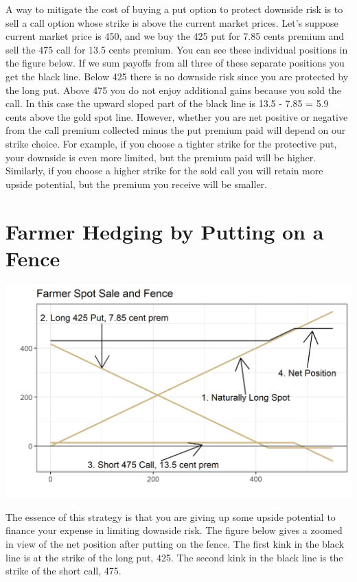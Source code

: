 \documentclass[
  letterpaper,
  DIV=11,
  numbers=noendperiod]{scrreprt}
\begin{document}
A way to mitigate the cost of buying a put option to protect downside
risk is to sell a call option whose strike is above the current market
prices. Let's suppose current market price is 450, and we buy the 425
put for 7.85 cents premium and sell the 475 call for 13.5 cents premium.
You can see these individual positions in the figure below. If we sum
payoffs from all three of these separate positions you get the black
line. Below 425 there is no downside risk since you are protected by the
long put. Above 475 you do not enjoy additional gains because you sold
the call. In this case the upward sloped part of the black line is 13.5
- 7.85 = 5.9 cents above the gold spot line. However, whether you are
net positive or negative from the call premium collected minus the put
premium paid will depend on our strike choice. For example, if you
choose a tighter strike for the protective put, your downside is even
more limited, but the premium paid will be higher. Similarly, if you
choose a higher strike for the sold call you will retain more upside
potential, but the premium you receive will be smaller.

\section{Farmer Hedging by Putting on a
Fence}\label{farmer-hedging-by-putting-on-a-fence}

\includegraphics{assets/Options4-spotfence.png}

The essence of this strategy is that you are giving up some upside
potential to finance your expense in limiting downside risk. The figure
below gives a zoomed in view of the net position after putting on the
fence. The first kink in the black line is at the strike of the long
put, 425. The second kink in the black line is the strike of the short
call, 475.
\end{document}
